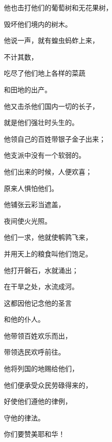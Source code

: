 {\par }{\Q {}他也击打他们的葡萄树和无花果树，
\par }{\Q 毁坏他们境内的树木。
\par }{\Q {}他说一声，就有蝗虫蚂蚱上来，
\par }{\Q 不计其数，
\par }{\Q {}吃尽了他们地上各样的菜蔬
\par }{\Q 和田地的出产。
\par }{\Q {}他又击杀他们国内一切的长子，
\par }{\Q 就是他们强壮时头生的。
\par }{\BB \par }{\Q {}他领自己的百姓带银子金子出来；
\par }{\Q 他支派中没有一个软弱的。
\par }{\Q {}他们出来的时候，{}人便欢喜；
\par }{\Q 原来{}人惧怕他们。
\par }{\Q {}他铺张云彩当遮盖，
\par }{\Q 夜间使火光照。
\par }{\Q {}他们一求，他就使鹌鹑飞来，
\par }{\Q 并用天上的粮食叫他们饱足。
\par }{\Q {}他打开磐石，水就涌出；
\par }{\Q 在干旱之处，水流成河。
\par }{\Q {}这都因他记念他的圣言
\par }{\Q 和他的仆人{}。
\par }{\BB \par }{\Q {}他带领百姓欢乐而出，
\par }{\Q 带领选民欢呼前往。
\par }{\Q {}他将列国的地赐给他们，
\par }{\Q 他们便承受众民劳碌得来的，
\par }{\Q {}好使他们遵他的律例，
\par }{\Q 守他的律法。
\par }{\BB \par }{\Q 你们要赞美耶和华！

}

